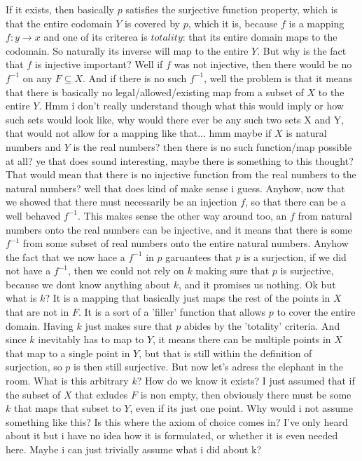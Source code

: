 \documentclass[11pt,a4paper]{article}
\begin{document}
If it exists, then basically $p$ satisfies
the surjective function property, which is that the entire codomain $Y$ is
covered by $p$, which it is, because $f$ is a mapping $f: y \to x$ and one
of its criterea is $totality$: that its entire domain maps to the codomain.
So naturally its inverse will map to the entire $Y$. But why is the fact
that $f$ is injective important? Well if $f$ was not injective, then there
would be no $f^{-1}$ on any $F \subseteq X$. And if there is no such $f^{-1}$,
well the problem is that it means that there is basically no legal/allowed/existing
map from a subset of $X$ to the entire $Y$. Hmm i don't really understand though
what this would imply or how such sets would look like, why would there ever be any
such two sets X and Y, that would not allow for a mapping like that... hmm maybe
if $X$ is natural numbers and $Y$ is the real numbers? then there is no such
function/map possible at all? ye that does sound interesting, maybe there is
something to this thought? That would mean that there is no injective
function from the real numbers to the natural numbers? well that does kind
of make sense i guess. Anyhow, now that we showed that there must necessarily
be an injection $f$, so that there can be a well behaved $f^{-1}$. This makes
sense the other way around too, an $f$ from natural numbers onto the real numbers
can be injective, and it means that there is some $f^{-1}$ from some subset of
real numbers onto the entire natural numbers. Anyhow the fact that we now
hace a $f^{-1}$ in $p$ garuantees that $p$ is a surjection, if we did not
have a $f^{-1}$, then we could not rely on $k$ making sure that $p$ is surjective,
because we dont know anything about $k$, and it promises us nothing. Ok but what is
$k$? It is a mapping that basically just maps the rest of the points in $X$ that
are not in $F$. It is a sort of a 'filler' function that allows $p$ to cover the
entire domain. Having $k$ just makes sure that $p$ abides by the 'totality' criteria.
And since $k$ inevitably has to map to $Y$, it means there can be multiple points in
$X$ that map to a single point in $Y$, but that is still within the definition of
surjection, so $p$ is then still surjective. But now let's adress the elephant in the
room. What is this arbitrary $k$? How do we know it exists? I just assumed that
if the subset of $X$ that exludes $F$ is non empty, then obviously there must be
some $k$ that maps that subset to $Y$, even if its just one point. Why would i not
assume something like this? Is this where the axiom of choice comes in? I've
only heard about it but i have no idea how it is formulated, or whether it is even
needed here. Maybe i can just trivially assume what i did about k?
\end{document}
